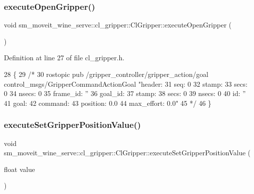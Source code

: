 \subsubsection{\texorpdfstring{execute\+Open\+Gripper()}{executeOpenGripper()}}
{\footnotesize\ttfamily void sm\+\_\+moveit\+\_\+wine\+\_\+serve\+::cl\+\_\+gripper\+::\+Cl\+Gripper\+::execute\+Open\+Gripper (\begin{DoxyParamCaption}{ }\end{DoxyParamCaption})\hspace{0.3cm}{\ttfamily [inline]}}



Definition at line 27 of file cl\+\_\+gripper.\+h.


\begin{DoxyCode}
28   \{
29     \textcolor{comment}{/*}
30 \textcolor{comment}{  rostopic pub /gripper\_controller/gripper\_action/goal control\_msgs/GripperCommandActionGoal "header:}
31 \textcolor{comment}{  seq: 0}
32 \textcolor{comment}{  stamp:}
33 \textcolor{comment}{    secs: 0}
34 \textcolor{comment}{    nsecs: 0}
35 \textcolor{comment}{  frame\_id: ''}
36 \textcolor{comment}{goal\_id:}
37 \textcolor{comment}{  stamp:}
38 \textcolor{comment}{    secs: 0}
39 \textcolor{comment}{    nsecs: 0}
40 \textcolor{comment}{  id: ''}
41 \textcolor{comment}{goal:}
42 \textcolor{comment}{  command:}
43 \textcolor{comment}{    position: 0.0}
44 \textcolor{comment}{    max\_effort: 0.0"}
45 \textcolor{comment}{    */}
46   \}
\end{DoxyCode}
\mbox{\label{classsm__moveit__wine__serve_1_1cl__gripper_1_1ClGripper_a7b273911dfd5385b3e416a867fe46c24}} 
\subsubsection{\texorpdfstring{execute\+Set\+Gripper\+Position\+Value()}{executeSetGripperPositionValue()}}
{\footnotesize\ttfamily void sm\+\_\+moveit\+\_\+wine\+\_\+serve\+::cl\+\_\+gripper\+::\+Cl\+Gripper\+::execute\+Set\+Gripper\+Position\+Value (\begin{DoxyParamCaption}\item[{float}]{value }\end{DoxyParamCaption})\hspace{0.3cm}{\ttfamily [inline]}}



